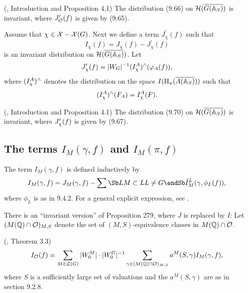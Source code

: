 \begin{proposition}
(\cite{A6}, Introduction and Proposition 4,1) The distribution
(9.66) on ${\cal{H}}(\overline{G({\Bbb{A}}_S)})$ is invariant,
where $J_{\cal{O}}^{\prime }(f)$ is given
by (9.65).
\end{proposition}

Assume that ${\chi }\in {\cal{X}}-{\cal{X}}(G)$.
Next we define a term $J_{{ \chi }}^{\prime }(f)$ such that 
\begin{equation}
I_{{\chi }}(f)=J_{{\chi }}(f)-J_{{\chi }}^{\prime }(f)
\end{equation}
is an invariant distribution on
${\cal{H}}(\overline{G({\Bbb{A}}_S)})$.
Let 
\begin{equation}
J_{{\chi }}^{\prime }(f)=|W_G|^{-1}(I_{{\cal \chi }}^A)^{\wedge
}(\varphi _A(f)),
\end{equation}
where $(I_{{\cal \chi }}^A)^{\wedge }$ denotes the distribution on the
space $I(\Pi _u(\overline{A({\Bbb {A}}_S)}))$ such that 
\[
(I_{{\cal \chi }}^A)^{\wedge }(F_A)=I_{{\cal \chi }}^A(F). 
\]

\begin{proposition}
(\cite{A6}, Introduction and Proposition 4.1) The distribution
(9.70) on ${\cal{H}}(\overline{G({\Bbb{A}}_S)})$ is invariant,
where $J_{{\cal \chi }}^{\prime }(f)$ is given by (9.67).
\end{proposition}

\subsection{The terms $I_M(\gamma, f)$ and $I_M(\pi,f)$}

The term $I_M(\gamma,f)$ is defined inductively by
\begin{equation}
I_M(\gamma,f)
=J_M(\gamma,f)-
\sum\Sb L\\ M\subset L\\ L\not= G\endSb
\hat{I}_M^L(\gamma,\phi_L(f)),
\end{equation}
where $\phi_L$ is as in 9.4.2.
For a general explicit expression, see \cite{A16}.

There is an ``invariant version'' of Proposition 279, where $J$ is
replaced by $I$: Let $(M({\Bbb{Q}})\cap {\cal{O}})_{M,S}$ denote the set of
$(M,S)$-equivalence classes in $M({\Bbb {Q}})\cap {\cal{O}}$.

\begin{proposition}
(\cite{A10}, Theorem 3.3) 
\[
I_{{\cal{O}}}(f)
=\sum_{M\in {\cal{L}}(G)}|W_0^M|\cdot |W_0^G|^{-1}
\sum_{\gamma \in (M({\Bbb{Q}})\cap {\cal{O}})_{M,S}}
a^M(S,\gamma )I_M(\gamma ,f),
\]
where $S$ is a sufficiently large set of valuations and the
$a^M(S,\gamma)$ are as in section 9.2.8.
\end{proposition}

